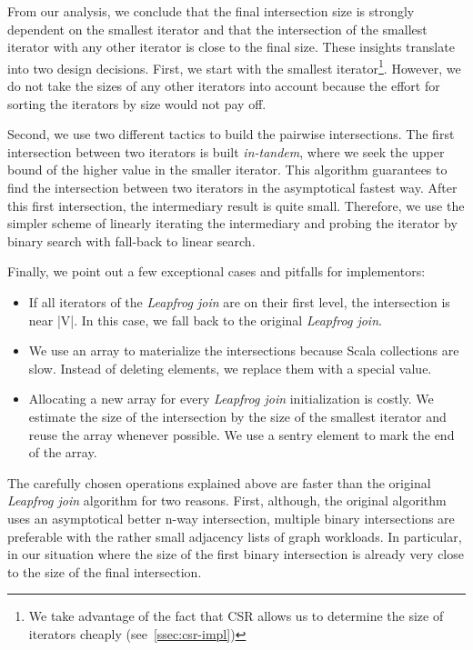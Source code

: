 From our analysis, we conclude that the final intersection size is strongly dependent on the
smallest iterator and that the intersection of the smallest iterator with any other iterator is
close to the final size.
These insights translate into two design decisions.
First, we start with the smallest iterator\footnote{We take advantage of the fact that CSR allows us
to determine the size of iterators cheaply (see~\cref{ssec:csr-impl})}.
However, we do not take the sizes of any other iterators into account because the effort for
sorting the iterators by size would not pay off.

Second, we use two different tactics to build the pairwise intersections.
The first intersection between two iterators is built \textit{in-tandem},  where we seek
the upper bound of the higher value in the smaller iterator.
This algorithm guarantees to find the intersection between two iterators in the asymptotical fastest
way.
After this first intersection, the intermediary result is quite small.
Therefore, we use the simpler scheme of linearly iterating the intermediary and probing
the iterator by binary search with fall-back to linear search.

Finally, we point out a few exceptional cases and pitfalls for implementors:
\begin{itemize}
\item If all iterators of the \textit{Leapfrog join} are on their first level, the intersection is near |V|. In this case, we fall back
to the original
\textit{Leapfrog join}.
\item We use an array to materialize the intersections because Scala collections are slow.
Instead of deleting elements, we replace them with a special value.
\item Allocating a new array for every \textit{Leapfrog join} initialization is costly.
We estimate the size of the intersection by the size of the smallest iterator and reuse the array whenever possible. We use a sentry element to mark the end of the array.
\end{itemize}

The carefully chosen operations explained above are faster than the original \textit{Leapfrog join}
algorithm for two reasons.
First, although, the original algorithm uses an asymptotical better n-way intersection, multiple
binary intersections are preferable with the rather small adjacency lists of graph workloads.
In particular, in our situation where the size of the first binary intersection is already
very close to the size of the final intersection.

